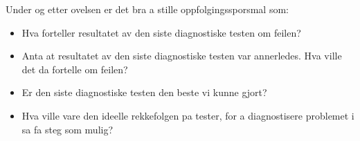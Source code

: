 Under og etter ovelsen er det bra a stille oppfolgingssporsmal som:

\begin{itemize}
\item{} Hva forteller resultatet av den siste diagnostiske testen om feilen?
\item{} Anta at resultatet av den siste diagnostiske testen var annerledes.  Hva ville det da fortelle om feilen?
\item{} Er den siste diagnostiske testen den beste vi kunne gjort?
\item{} Hva ville vare den ideelle rekkefolgen pa tester, for a diagnostisere problemet i sa fa steg som mulig?
\end{itemize}




